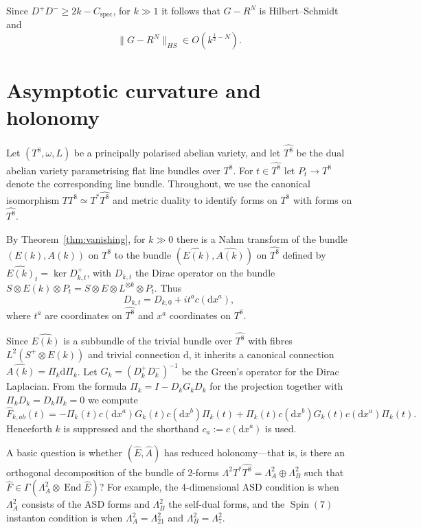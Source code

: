 \documentclass{article}
\newcommand{\di}{\mathrm{d}}
\newcommand{\wh}{\widehat}
\newcommand{\inv}{^{-1}}
\newcommand{\cspec}{C_{\mathrm{spec}}}
\DeclareMathOperator\Spin{Spin}
\DeclareMathOperator\End{End}
\theoremstyle{definition}
\theoremstyle{remark}
\begin{document}
Since $D^+ D^- \ge 2k - \cspec$, for $k \gg 1$ it follows that $G - R^N$ is Hilbert--Schmidt and
\begin{equation}
    \label{eq:greensest}
    \| G - R^N \|_{HS} \in O(k^{\frac{1}{2}-N}).
\end{equation}
\section{Asymptotic curvature and holonomy}
\label{sec:curvature}

Let $(T^8, \omega, L)$ be a principally polarised abelian variety, and let $\wh{T^8}$ be the dual abelian variety parametrising flat line bundles over $T^8$.
For $t \in \wh{T^8}$ let $P_t \to T^8$ denote the corresponding line bundle.
Throughout, we use the canonical isomorphism $T T^8 \simeq T^* \wh{T^8}$ and metric duality to identify forms on $T^8$ with forms on $\wh{T^8}$.

By Theorem~\ref{thm:vanishing}, for $k \gg 0$ there is a Nahm transform of the bundle $(E(k), A(k))$ on $T^8$ to the bundle $(\wh{E(k)}, \wh{A(k)})$ on $\wh{T^8}$ defined by $\wh{E(k)}_t = \ker D^+_{k,t}$, with $D_{k,t}$ the Dirac operator on the bundle $S \otimes E(k) \otimes P_t = S \otimes E \otimes L^{\otimes k} \otimes P_t$.
Thus
\[
    D_{k,t} = D_{k,0} + i t^a c(\di x^a),
\]
where $t^a$ are coordinates on $\wh{T^8}$ and $x^a$ coordinates on $T^8$.

Since $\wh{E(k)}$ is a subbundle of the trivial bundle over $\wh{T^8}$ with fibres $L^2(S^+ \otimes E(k))$ and trivial connection $\di$, it inherits a canonical connection $\wh{A(k)} = \Pi_k \di \Pi_k$.
Let $G_k = (D_k^+ D_k^-)\inv$ be the Green's operator for the Dirac Laplacian.
From the formula $\Pi_k = I - D_k G_k D_k$ for the projection together with $\Pi_k D_k = D_k \Pi_k = 0$ we compute
\begin{equation}
    \label{eq:curv}
    \wh{F}_{k,ab}(t) = -\Pi_k(t) c(\di x^a) G_k(t) c(\di x^b) \Pi_k(t) + \Pi_k(t) c(\di x^b) G_k(t) c(\di x^a) \Pi_k(t).
\end{equation}
Henceforth $k$ is suppressed and the shorthand $c_a := c(\di x^a)$ is used.

A basic question is whether $(\wh{E}, \wh{A})$ has reduced holonomy---that is, is there an orthogonal decomposition of the bundle of 2-forms $\Lambda^2T^*\wh{T^8} = \Lambda^2_A \oplus \Lambda^2_B$ such that $\wh{F} \in \Gamma(\Lambda^2_A \otimes \End \wh{E})$?
For example, the 4-dimensional ASD condition is when $\Lambda^2_A$ consists of the ASD forms and $\Lambda^2_B$ the self-dual forms, and the $\Spin(7)$ instanton condition is when $\Lambda^2_A = \Lambda^2_{21}$ and $\Lambda^2_B = \Lambda^2_7$.
\end{document}
